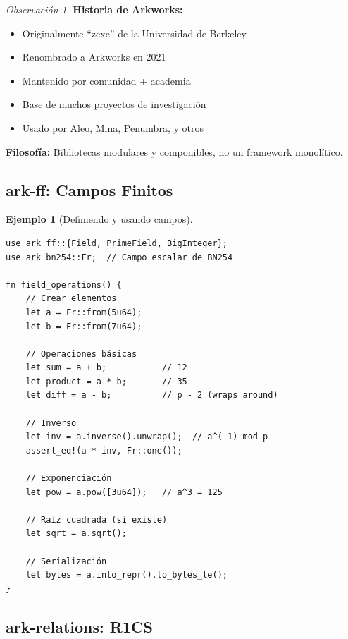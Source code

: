 \documentclass[11pt,a4paper,twoside,openright]{book}
\theoremstyle{definition}
\newtheorem{example}{Ejemplo}[chapter]
\theoremstyle{plain}
\theoremstyle{remark}
\newtheorem{remark}{Observación}[chapter]
\begin{document}
\begin{remark}
\textbf{Historia de Arkworks:}

\begin{itemize}
    \item Originalmente ``zexe'' de la Universidad de Berkeley
    \item Renombrado a Arkworks en 2021
    \item Mantenido por comunidad + academia
    \item Base de muchos proyectos de investigación
    \item Usado por Aleo, Mina, Penumbra, y otros
\end{itemize}

\textbf{Filosofía:} Bibliotecas modulares y componibles, no un framework monolítico.
\end{remark}

\subsection{ark-ff: Campos Finitos}

\begin{example}[Definiendo y usando campos]
\begin{verbatim}
use ark_ff::{Field, PrimeField, BigInteger};
use ark_bn254::Fr;  // Campo escalar de BN254

fn field_operations() {
    // Crear elementos
    let a = Fr::from(5u64);
    let b = Fr::from(7u64);
    
    // Operaciones básicas
    let sum = a + b;           // 12
    let product = a * b;       // 35
    let diff = a - b;          // p - 2 (wraps around)
    
    // Inverso
    let inv = a.inverse().unwrap();  // a^(-1) mod p
    assert_eq!(a * inv, Fr::one());
    
    // Exponenciación
    let pow = a.pow([3u64]);   // a^3 = 125
    
    // Raíz cuadrada (si existe)
    let sqrt = a.sqrt();
    
    // Serialización
    let bytes = a.into_repr().to_bytes_le();
}
\end{verbatim}
\end{example}

\subsection{ark-relations: R1CS}
\end{document}
